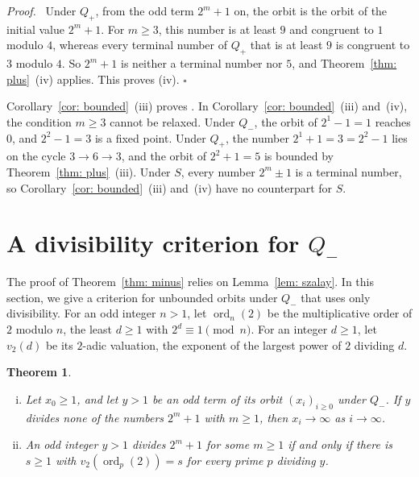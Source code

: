 \documentclass{article}
\newtheorem{theorem}{Theorem}
\newenvironment{proof}[1][Proof]{\par\medskip\noindent\textit{#1.}\ }{\hfill$\square$\par\medskip}
\newcommand{\Ge}{\geqslant}
\newcommand{\ord}{\operatorname{ord}}
\begin{document}
\begin{proof}
    Under $Q_+$, from the odd term $2^m + 1$ on, the orbit is the orbit of the initial value $2^m + 1$. For $m \Ge 3$, this number is at least $9$ and congruent to $1$ modulo $4$, whereas every terminal number of $Q_+$ that is at least $9$ is congruent to $3$ modulo $4$. So $2^m + 1$ is neither a terminal number nor $5$, and Theorem~\ref{thm: plus}~(iv) applies. This proves (iv).
\end{proof}

Corollary~\ref{cor: bounded}~(iii) proves \citep[Conjecture~4]{sedaghat2020bounded}. In Corollary~\ref{cor: bounded}~(iii) and~(iv), the condition $m \Ge 3$ cannot be relaxed. Under $Q_-$, the orbit of $2^1 - 1 = 1$ reaches $0$, and $2^2 - 1 = 3$ is a fixed point. Under $Q_+$, the number $2^1 + 1 = 3 = 2^2 - 1$ lies on the cycle $3 \to 6 \to 3$, and the orbit of $2^2 + 1 = 5$ is bounded by Theorem~\ref{thm: plus}~(iii). Under $S$, every number $2^m \pm 1$ is a terminal number, so Corollary~\ref{cor: bounded}~(iii) and~(iv) have no counterpart for $S$.

\section{A divisibility criterion for \texorpdfstring{$Q_-$}{Q-}}
\label{sec: criterion}

The proof of Theorem~\ref{thm: minus} relies on Lemma~\ref{lem: szalay}. In this section, we give a criterion for unbounded orbits under $Q_-$ that uses only divisibility. For an odd integer $n > 1$, let $\ord_n(2)$ be the multiplicative order of $2$ modulo $n$, the least $d \Ge 1$ with $2^d \equiv 1 \pmod n$. For an integer $d \Ge 1$, let $v_2(d)$ be its $2$-adic valuation, the exponent of the largest power of $2$ dividing $d$.

\begin{theorem}
\label{thm: criterion}
    \begin{enumerate}[(i)]
        \setlength{\itemsep}{0pt}
        \item Let $x_0 \Ge 1$, and let $y > 1$ be an odd term of its orbit $(x_i)_{i \Ge 0}$ under $Q_-$. If $y$ divides none of the numbers $2^m + 1$ with $m \Ge 1$, then $x_i \to \infty$ as $i \to \infty$.
        \item An odd integer $y > 1$ divides $2^m + 1$ for some $m \Ge 1$ if and only if there is $s \Ge 1$ with $v_2(\ord_p(2)) = s$ for every prime $p$ dividing $y$.
    \end{enumerate}
\end{theorem}
\end{document}
